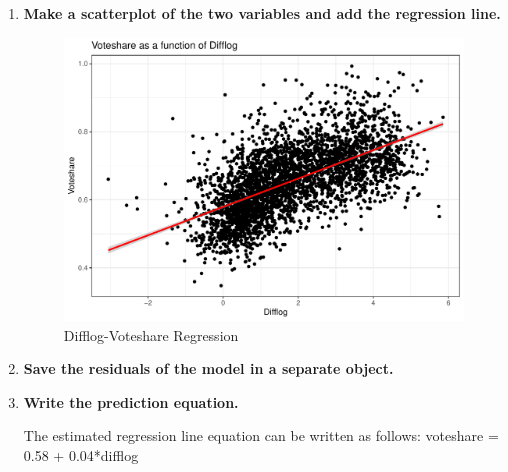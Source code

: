 \documentclass[12pt,letterpaper]{article}
\begin{document}
\begin{enumerate}
		\newpage   
		\item \textbf{Make a scatterplot of the two variables and add the regression line.} 	\vspace{.25cm}
		
		
		
		\vspace{.5cm}
		
		\begin{figure}[!htbp]\centering
			\caption{\footnotesize Difflog-Voteshare Regression}
			\label{fig:plot_5}
			\includegraphics[width=.85\textwidth]{Q1graph.pdf}
		\end{figure}
		
		
		\item \textbf{Save the residuals of the model in a separate object.}
		\vspace{.25cm}
		
		
		\vspace{.1cm}
		
		
		\vspace{.25cm}
		\item \textbf{Write the prediction equation.}
		
		\noindent The estimated regression line equation can be written as follows: 
		\newline 
		voteshare = 0.58 + 0.04*difflog
		
	\end{enumerate}
	
	\newpage
	
\end{document}
